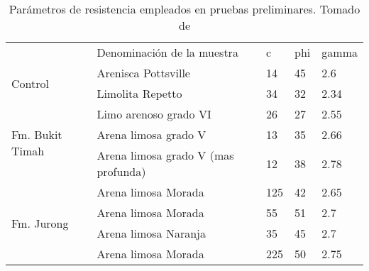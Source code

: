 \begin{table}[H]
\centering
\label{tabla_parametros}
\begin{tabular}{lllll}
                                                  & Denominaci\'on de la muestra          & c   & phi & gamma                     \\ \cline{2-5} 
\multicolumn{1}{l|}{\multirow{2}{*}{Control}}     & Arenisca Pottsville                 & 14  & 45  & \multicolumn{1}{l|}{2.6}  \\
\multicolumn{1}{l|}{}                             & Limolita Repetto                    & 34  & 32  & \multicolumn{1}{l|}{2.34} \\ \hline
\multicolumn{1}{l|}{\multirow{3}{*}{Fm. Bukit Timah}} & Limo arenoso grado VI               & 26  & 27  & \multicolumn{1}{l|}{2.55} \\
\multicolumn{1}{l|}{}                             & Arena limosa grado V                & 13  & 35  & \multicolumn{1}{l|}{2.66} \\
\multicolumn{1}{l|}{}                             & Arena limosa grado V (mas profunda) & 12  & 38  & \multicolumn{1}{l|}{2.78} \\ \hline
\multicolumn{1}{l|}{\multirow{4}{*}{Fm. Jurong}}      & Arena limosa Morada                 & 125 & 42  & \multicolumn{1}{l|}{2.65} \\
\multicolumn{1}{l|}{}                             & Arena limosa Morada                 & 55  & 51  & \multicolumn{1}{l|}{2.7}  \\
\multicolumn{1}{l|}{}                             & Arena limosa Naranja                & 35  & 45  & \multicolumn{1}{l|}{2.7}  \\
\multicolumn{1}{l|}{}                             & Arena limosa Morada                 & 225 & 50  & \multicolumn{1}{l|}{2.75} \\ \cline{2-5} 

\end{tabular}
\caption{Par\'ametros de resistencia empleados en pruebas preliminares. Tomado de \cite{singapore}}
\label{tab:testtParameter}
\end{table}


